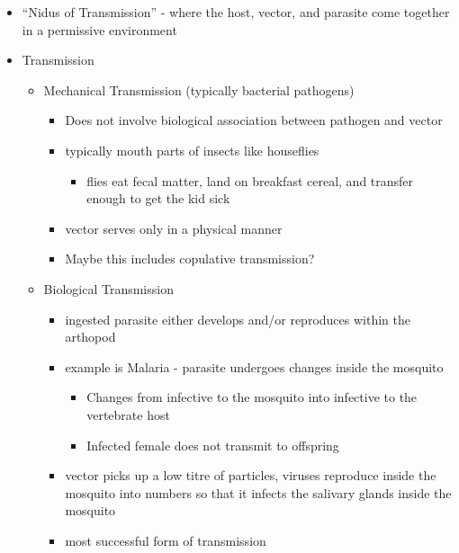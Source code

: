\documentclass{article}
\begin{document}
            \begin{itemize}
                \item ``Nidus of Transmission'' - where the host, vector, and parasite come together in a permissive environment
                \item Transmission
                \begin{itemize}
                    \item Mechanical Transmission (typically bacterial pathogens)
                    \begin{itemize}
                        \item Does not involve biological association between pathogen and vector
                        \item typically mouth parts of insects like houseflies
                        \begin{itemize}
                            \item flies eat fecal matter, land on breakfast cereal, and transfer enough to get the kid sick
                        \end{itemize}
                        \item vector serves only in a physical manner
                        \item Maybe this includes copulative transmission?
                    \end{itemize}
                    \item Biological Transmission
                    \begin{itemize}
                        \item ingested parasite either develops and/or reproduces within the arthopod
                        \item example is Malaria - parasite undergoes changes inside the mosquito
                        \begin{itemize}
                            \item Changes from infective to the mosquito into infective to the vertebrate host
                            \item Infected female does not transmit to offspring
                        \end{itemize}
                        \item vector picks up a low titre of particles, viruses reproduce inside the mosquito into numbers so that it infects the salivary glands inside the mosquito
                        \item most successful form of transmission

\end{itemize}
\end{itemize}
\end{itemize}
\end{document}
